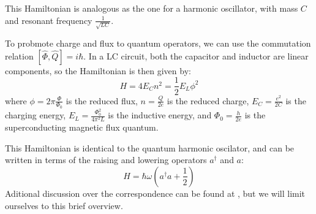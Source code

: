 \documentclass[
  journal=largetwo,
  year=2023,
]{cup-journal}
\begin{document}
\noindent This Hamiltonian is analogous as the one for a harmonic oscillator, with mass \(C\) and resonant frequency \(\frac{1}{\sqrt{LC} }\).

To probmote charge and flux to quantum operators, we can use the commutation relation \( [\hat\Phi, \hat Q] = i\hbar \). In a LC circuit, both the capacitor and inductor are linear components, so the Hamiltonian is then given by:
\begin{equation}
  H = 4E_C n^2 = \frac{1}{2}E_L\phi^2
\end{equation}
\noindent where \(\phi = 2\pi\frac{\Phi}{\Phi_0}\) is the reduced flux, \(n = \frac{Q}{2e}\) is the reduced charge, \(E_C = \frac{e^2}{2C}\) is the charging energy, \(E_L = \frac{\Phi_0^2}{4\pi^2L}\) is the inductive energy, and \(\Phi_0 = \frac{h}{2e}\) is the superconducting magnetic flux quantum.

This Hamiltonian is identical to the quantum harmonic oscilator, and can be written in terms of the raising and lowering operators \(a^\dagger\) and \(a\):
\begin{equation}
  H = \hbar\omega(a^\dagger a + \frac{1}{2})
\end{equation}
\noindent Aditional discussion over the correspondence can be found at \autocite{krantz_2019_a}, but we will limit ourselves to this brief overview.
\end{document}
